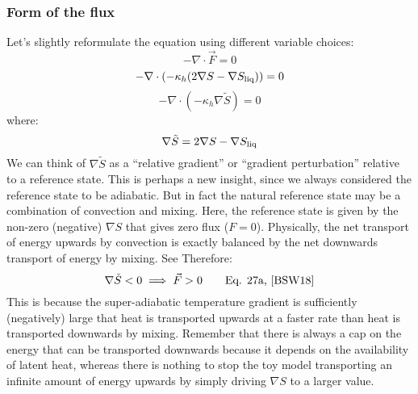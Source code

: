 \subsubsection{Form of the flux}
Let's slightly reformulate the equation using different variable choices:
\begin{equation}
-\nabla \cdot \vec{F} = 0
\end{equation}
\begin{equation}
-\nabla \cdot (- \kappa_h (2 \nabla S - \nabla S_{\rm liq})) = 0
\end{equation}
\begin{equation}
-\nabla \cdot (- \kappa_h \nabla \tilde{S}) = 0
\end{equation}
where:
\begin{equation}
\nabla \tilde{S}=2 \nabla S - \nabla S_{\rm liq}
\end{equation}
We can think of $\nabla \tilde{S}$ as a ``relative gradient'' or ``gradient perturbation'' relative to a reference state.  This is perhaps a new insight, since we always considered the reference state to be adiabatic.  But in fact the natural reference state may be a combination of convection and mixing.  Here, the reference state is given by the non-zero (negative) $\nabla S$ that gives zero flux ($F=0$).  Physically, the net transport of energy upwards by convection is exactly balanced by the net downwards transport of energy by mixing.  See \citet[Eq.~27 and Fig.~1]{BSW18}  Therefore:
\begin{equation}
\nabla \tilde{S}<0 \implies \vec{F}>0 \qquad \text{Eq. 27a, \cite{BSW18}}
\end{equation}
This is because the super-adiabatic temperature gradient is sufficiently (negatively) large that heat is transported upwards at a faster rate than heat is transported downwards by mixing.  Remember that there is always a cap on the energy that can be transported downwards because it depends on the availability of latent heat, whereas there is nothing to stop the toy model transporting an infinite amount of energy upwards by simply driving $\nabla S$ to a larger value.
